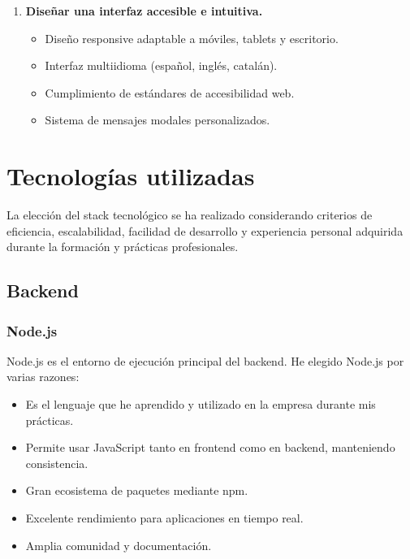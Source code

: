 \documentclass[12pt,a4paper]{article}
\begin{document}
\begin{enumerate}
    \item \textbf{Diseñar una interfaz accesible e intuitiva.}
    \begin{itemize}
        \item Diseño responsive adaptable a móviles, tablets y escritorio.
        \item Interfaz multiidioma (español, inglés, catalán).
        \item Cumplimiento de estándares de accesibilidad web.
        \item Sistema de mensajes modales personalizados.
    \end{itemize}
\end{enumerate}

\newpage

\section{Tecnologías utilizadas}

La elección del stack tecnológico se ha realizado considerando criterios de eficiencia, escalabilidad, facilidad de desarrollo y experiencia personal adquirida durante la formación y prácticas profesionales.

\subsection{Backend}

\subsubsection{Node.js}

Node.js es el entorno de ejecución principal del backend. He elegido Node.js por varias razones:

\begin{itemize}
    \item Es el lenguaje que he aprendido y utilizado en la empresa durante mis prácticas.
    \item Permite usar JavaScript tanto en frontend como en backend, manteniendo consistencia.
    \item Gran ecosistema de paquetes mediante npm.
    \item Excelente rendimiento para aplicaciones en tiempo real.
    \item Amplia comunidad y documentación.
\end{itemize}
\end{document}
